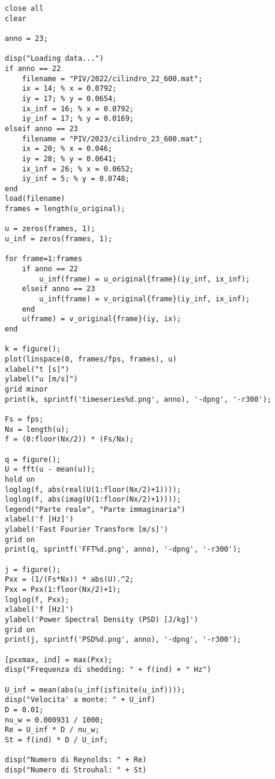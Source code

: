 \begin{lstlisting}[style=Matlab-editor, basicstyle=\ttfamily\footnotesize]
close all
clear

anno = 23;

disp("Loading data...")
if anno == 22
    filename = "PIV/2022/cilindro_22_600.mat";
    ix = 14; % x = 0.0792;
    iy = 17; % y = 0.0654;
    ix_inf = 16; % x = 0.0792;
    iy_inf = 17; % y = 0.0169;
elseif anno == 23
    filename = "PIV/2023/cilindro_23_600.mat";
    ix = 20; % x = 0.046;
    iy = 28; % y = 0.0641;
    ix_inf = 26; % x = 0.0652;
    iy_inf = 5; % y = 0.0748;
end
load(filename)
frames = length(u_original);

u = zeros(frames, 1);
u_inf = zeros(frames, 1);

for frame=1:frames
    if anno == 22
        u_inf(frame) = u_original{frame}(iy_inf, ix_inf);
    elseif anno == 23
        u_inf(frame) = v_original{frame}(iy_inf, ix_inf);
    end
    u(frame) = v_original{frame}(iy, ix);
end

k = figure();
plot(linspace(0, frames/fps, frames), u)
xlabel("t [s]")
ylabel("u [m/s]")
grid minor
print(k, sprintf('timeseries%d.png', anno), '-dpng', '-r300');

Fs = fps;
Nx = length(u);
f = (0:floor(Nx/2)) * (Fs/Nx);

q = figure();
U = fft(u - mean(u));
hold on
loglog(f, abs(real(U(1:floor(Nx/2)+1))));
loglog(f, abs(imag(U(1:floor(Nx/2)+1))));
legend("Parte reale", "Parte immaginaria")
xlabel('f [Hz]')
ylabel('Fast Fourier Transform [m/s]')
grid on
print(q, sprintf('FFT%d.png', anno), '-dpng', '-r300');

j = figure();
Pxx = (1/(Fs*Nx)) * abs(U).^2;
Pxx = Pxx(1:floor(Nx/2)+1);
loglog(f, Pxx);
xlabel('f [Hz]')
ylabel('Power Spectral Density (PSD) [J/kg]')
grid on
print(j, sprintf('PSD%d.png', anno), '-dpng', '-r300');

[pxxmax, ind] = max(Pxx);
disp("Frequenza di shedding: " + f(ind) + " Hz")

U_inf = mean(abs(u_inf(isfinite(u_inf))));
disp("Velocita' a monte: " + U_inf)
D = 0.01;
nu_w = 0.000931 / 1000;
Re = U_inf * D / nu_w;
St = f(ind) * D / U_inf;

disp("Numero di Reynolds: " + Re)
disp("Numero di Strouhal: " + St)
\end{lstlisting}
